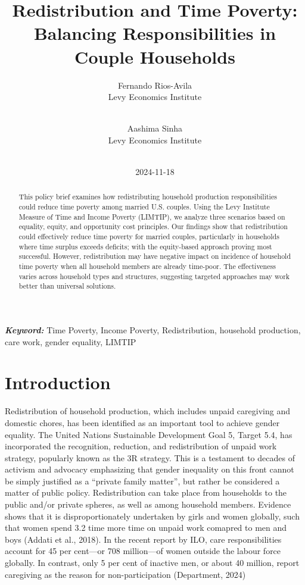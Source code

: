 \documentclass[
  11pt,
]{article}
\title{Redistribution and Time Poverty: Balancing Responsibilities in
Couple Households}
\author{
Fernando Rios-Avila\\
Levy Economics Institute\\
\\
\and 
Aashima Sinha\\
Levy Economics Institute\\
\\
}
\date{2024-11-18}
\begin{document}
\def\spacingset#1{\renewcommand{\baselinestretch}%
{#1}\small\normalsize} \spacingset{1}


\maketitle
\begin{abstract}
This policy brief examines how redistributing household production
responsibilities could reduce time poverty among married U.S. couples.
Using the Levy Institute Measure of Time and Income Poverty (LIMTIP), we
analyze three scenarios based on equality, equity, and opportunity cost
principles. Our findings show that redistribution could effectively
reduce time poverty for married couples, particularly in households
where time surplus exceeds deficits; with the equity-based approach
proving most successful. However, redistribution may have negative
impact on incidence of household time poverty when all household members
are already time-poor. The effectiveness varies across household types
and structures, suggesting targeted approaches may work better than
universal solutions.
\end{abstract}
 
\vspace{.2in}

\textbf{\textit{Keyword: }}Time Poverty, Income Poverty, Redistribution,
household production, care work, gender equality, LIMTIP


\thispagestyle{empty}
\clearpage{}
\newpage
\spacingset{1.2} %
\section{Introduction}\label{introduction}

Redistribution of household production, which includes unpaid caregiving
and domestic chores, has been identified as an important tool to achieve
gender equality. The United Nations Sustainable Development Goal 5,
Target 5.4, has incorporated the recognition, reduction, and
redistribution of unpaid work strategy, popularly known as the 3R
strategy. This is a testament to decades of activism and advocacy
emphasizing that gender inequality on this front cannot be simply
justified as a ``private family matter'', but rather be considered a
matter of public policy. Redistribution can take place from households
to the public and/or private spheres, as well as among household
members. Evidence shows that it is disproportionately undertaken by
girls and women globally, such that women spend 3.2 time more time on
unpaid work comapred to men and boys (Addati et al., 2018). In the
recent report by ILO, care responsibilities account for 45 per cent---or
708 million---of women outside the labour force globally. In contrast,
only 5 per cent of inactive men, or about 40 million, report caregiving
as the reason for non-participation (Department, 2024)
\end{document}
